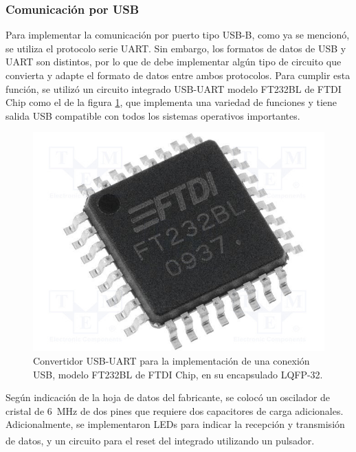 \subsubsection{Comunicación por USB}

Para implementar la comunicación por puerto tipo USB-B, como ya se mencionó, se utiliza el protocolo serie UART. Sin embargo, los formatos de datos de USB y UART son distintos, por lo que de debe implementar algún tipo de circuito que convierta y adapte el formato de datos entre ambos protocolos. Para cumplir esta función, se utilizó un circuito integrado USB-UART modelo {\Medium FT232BL de FTDI Chip} como el de la figura \ref{ft232bl}, que implementa una variedad de funciones y tiene salida USB compatible con todos los sistemas operativos importantes.\\

\begin{figure}[h]
    \centering
    \includegraphics[scale=0.2]{Imagenes/FT232BL.jpg}
    \caption{Convertidor USB-UART para la implementación de una conexión USB, modelo FT232BL de FTDI Chip, en su encapsulado LQFP-32.}
    \label{ft232bl}
\end{figure}

Según indicación de la hoja de datos del fabricante, se colocó un oscilador de cristal de \SI[]{6}{\mega\hertz} de dos pines que requiere dos capacitores de carga adicionales. Adicionalmente, se implementaron LEDs para indicar la recepción y transmisión de datos, y un circuito para el reset del integrado utilizando un pulsador.\textsuperscript{\cite{DatasheetFT232BL}}\\

